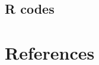 \documentclass[11pt]{scrartcl} %
\begin{document}
\subsection{R codes}


\section{References}











\end{document}
